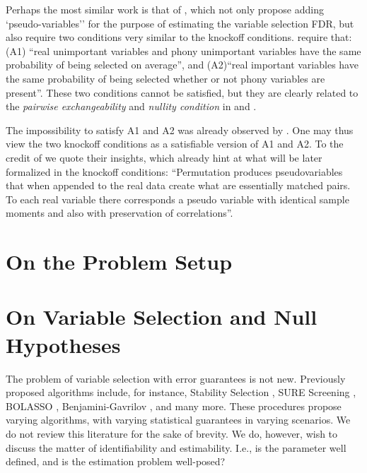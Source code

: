 \documentclass[article,lineno]{biometrika}
\begin{document}
Perhaps the most similar work is that of \cite{WuControllingVariableSelection2007}, which not only propose adding `pseudo-variables'' for the purpose of estimating the variable selection FDR, but also require two conditions very similar to the knockoff conditions. 
\cite{WuControllingVariableSelection2007} require that:
(A1) ``real unimportant variables and phony unimportant variables have the same probability of being selected on average'', and (A2)``real important variables have the same probability of being selected whether or not phony variables are present''.
These two conditions cannot be satisfied, but they are clearly related to the \emph{pairwise exchangeability} and \emph{nullity condition} in \cite{SesiaGenehuntinghidden} and \cite{CandesPanninggoldmodelX2018}.

The impossibility to satisfy A1 and A2 was already observed by \cite{WuControllingVariableSelection2007}. 
One may thus view the two knockoff conditions as a satisfiable version of A1 and A2.
To the credit of \cite{WuControllingVariableSelection2007} we quote their insights, which already hint at what will be later formalized in the knockoff conditions:
``Permutation produces pseudovariables that when appended to the real data create what
are essentially matched pairs. To each real variable there corresponds a pseudo variable with identical sample moments and also with preservation of correlations''.




\section{On the Problem Setup}



\section{On Variable Selection and Null Hypotheses}
The problem of variable selection with error guarantees is not new. 
Previously proposed algorithms include, for instance, Stability Selection \citep{MeinshausenStabilityselection2010}, SURE Screening \citep{fan2008sure}, BOLASSO \citep{bach2008bolasso}, Benjamini-Gavrilov \citep{Benjaminisimpleforwardselection2009}, and many more. 
These procedures propose varying algorithms, with varying statistical guarantees in varying scenarios. 
We do not review this literature for the sake of brevity. 
We do, however, wish to discuss the matter of identifiability and estimability. 
I.e., is the parameter well defined, and is the estimation problem well-posed? 
\end{document}
